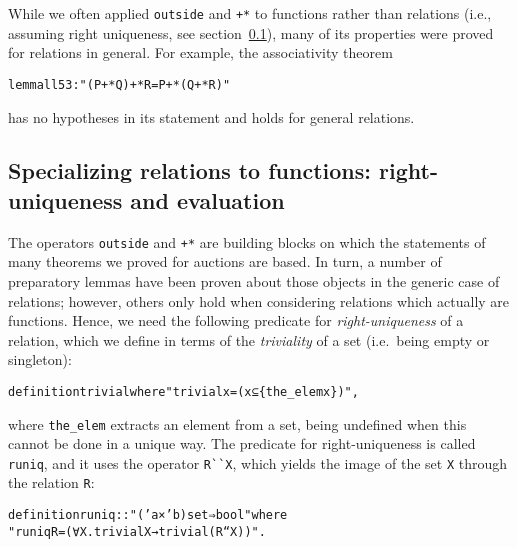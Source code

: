 \documentclass[
]{llncs}
\newenvironment{mytable}{
\vspace{0.2ex}
\begin{center}\begin{minipage}
{0.9\textwidth}\renewcommand{\baselinestretch}{0.75}\begin{small}}
{\end{small}\end{minipage}\end{center}
\vspace{0.1ex}
}
\begin{document}
While we often applied \verb|outside| and \verb|+*| to functions rather than relations (i.e., assuming right uniqueness, see section~\ref{RefRuniq}), many of its properties were proved for relations in general.  For example, the associativity theorem
\begin{mytable}
\begin{alltt}
lemma ll53: "(P +* Q) +* R = P +* (Q +* R)"
\end{alltt}
\end{mytable}
has no hypotheses in its statement and holds for general relations.

\subsection{Specializing relations to functions: right-uniqueness and evaluation}
\label{RefRuniq}
The operators \verb|outside|
and \verb|+*| are 
building blocks on which the statements of many theorems we proved for auctions are based.
In turn, a number of preparatory lemmas have been proven about those objects in the generic case of relations; however, others only hold when considering relations which actually are functions.
Hence, we need the following predicate for \emph{right-uniqueness} of a relation, which we define in terms of the \emph{triviality} of a set (i.e.\ being empty or singleton):
\begin{mytable}
\begin{alltt}
definition trivial where "trivial x = (x ⊆ \{the_elem x\})",
\end{alltt}
\end{mytable}
where \verb|the_elem| extracts an element from a set, being undefined when this cannot be done in a unique way.
The predicate for right-uniqueness is called \verb|runiq|, and it uses the operator \verb|R``X|, which yields the image of the set \verb|X| through the relation \verb|R|:
\begin{mytable}
\begin{alltt}
definition runiq :: "('a × 'b) set ⇒ bool" where
"runiq R = (∀ X . trivial X → trivial (R `` X))".
\end{alltt}\end{mytable}
\end{document}

